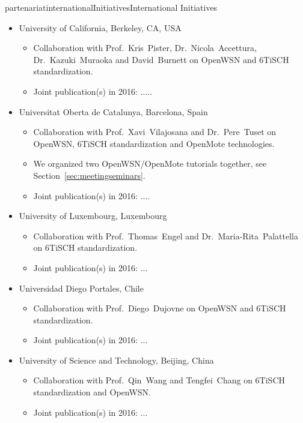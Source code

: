 \documentclass{ra2016}
\begin{document}
\begin{module}{partenariat}{internationalInitiatives}{International Initiatives}
\begin{itemize}
    \item University of California, Berkeley, CA, USA
        \begin{itemize}
            \item Collaboration with Prof.~Kris~Pister, Dr.~Nicola~Accettura, Dr.~Kazuki~Muraoka and David~Burnett on OpenWSN and 6TiSCH standardization.
            \item Joint publication(s) in 2016: .....
        \end{itemize}
    \item Universitat Oberta de Catalunya, Barcelona, Spain
        \begin{itemize}
            \item Collaboration with Prof.~Xavi~Vilajosana and Dr.~Pere~Tuset on OpenWSN, 6TiSCH standardization and OpenMote technologies.
            \item We organized two OpenWSN/OpenMote tutorials together, see Section~\ref{sec:meetingseminars}.
            \item Joint publication(s) in 2016: ....
        \end{itemize}
    \item University of Luxembourg, Luxembourg
        \begin{itemize}
            \item Collaboration with Prof.~Thomas~Engel and Dr.~Maria-Rita~Palattella on 6TiSCH standardization.
            \item Joint publication(s) in 2016: ...
        \end{itemize}
    \item Universidad Diego Portales, Chile
        \begin{itemize}
            \item Collaboration with Prof.~Diego~Dujovne on OpenWSN and 6TiSCH standardization.
            \item Joint publication(s) in 2016: ...
        \end{itemize}
    \item University of Science and Technology, Beijing, China
        \begin{itemize}
            \item Collaboration with Prof.~Qin~Wang and Tengfei~Chang on 6TiSCH standardization and OpenWSN.
            \item Joint publication(s) in 2016: ...
        \end{itemize}

\end{itemize}
\end{module}
\end{document}
